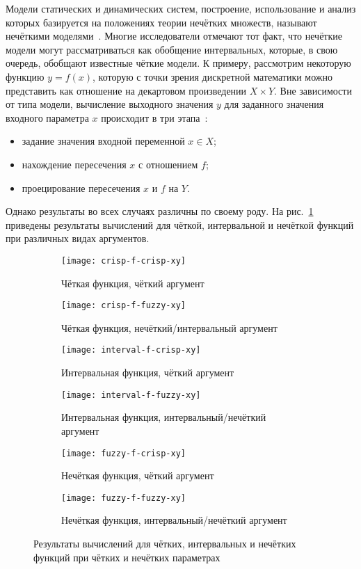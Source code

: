 Модели статических и динамических систем, построение, использование и анализ которых базируется на положениях теории нечётких множеств, называют нечёткими моделями~\cite{Borisov_Fedulov}. Многие исследователи отмечают тот факт, что нечёткие модели могут рассматриваться как обобщение интервальных, которые, в свою очередь, обобщают известные чёткие модели. К примеру, рассмотрим некоторую функцию $y=f \left(x \right)$, которую с точки зрения дискретной математики можно представить как отношение на декартовом произведении $X \times Y$. Вне зависимости от типа модели, вычисление выходного значения $y$ для заданного значения входного параметра $x$ происходит в три этапа~\cite{Borisov_Fedulov}:
\begin{itemize}
	\item задание значения входной переменной $x \in X$;
	\item нахождение пересечения $x$ с отношением $f$;
	\item проецирование пересечения $x$ и $f$ на $Y$.
\end{itemize}

Однако результаты во всех случаях различны по своему роду. На рис.~\ref{fig:functypes-restypes} приведены результаты вычислений для чёткой, интервальной и нечёткой функций при различных видах аргументов.

\begin{figure}[pH]
  \centering
  \begin{subfigure}[t]{0.4\textwidth}
    \texttt{[image: crisp-f-crisp-xy]}
    \caption{Чёткая функция, чёткий аргумент}
  \end{subfigure}
  \quad
  \begin{subfigure}[t]{0.4\textwidth}
    \texttt{[image: crisp-f-fuzzy-xy]}
    \caption{Чёткая функция, нечёткий/интервальный аргумент}
  \end{subfigure}
  
  \begin{subfigure}[h]{0.4\textwidth}
    \texttt{[image: interval-f-crisp-xy]}
    \caption{Интервальная функция, чёткий аргумент}
  \end{subfigure}
  \quad
  \begin{subfigure}[h]{0.4\textwidth}
    \texttt{[image: interval-f-fuzzy-xy]}
    \caption{Интервальная функция, интервальный/нечёткий аргумент}
  \end{subfigure}
  
  \begin{subfigure}[b]{0.4\textwidth}
    \texttt{[image: fuzzy-f-crisp-xy]}
    \caption{Нечёткая функция, чёткий аргумент}
  \end{subfigure}
  \quad
  \begin{subfigure}[b]{0.4\textwidth}
    \texttt{[image: fuzzy-f-fuzzy-xy]}
    \caption{Нечёткая функция, интервальный/нечёткий аргумент}
  \end{subfigure}
  \caption{Результаты вычислений для чётких, интервальных и нечётких функций при чётких и нечётких параметрах}
  \label{fig:functypes-restypes}
\end{figure}

